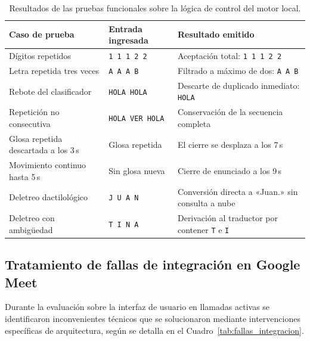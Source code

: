 \begin{table}[H]
\centering
\small
\caption{Resultados de las pruebas funcionales sobre la lógica de control del motor local.}
\label{tab:bateria_logica}
\begin{tabularx}{\textwidth}{l l X}
\toprule
\textbf{Caso de prueba} & \textbf{Entrada ingresada} & \textbf{Resultado emitido} \\
\midrule
Dígitos repetidos & \texttt{1 1 1 2 2} & Aceptación total: \texttt{1 1 1 2 2} \\
Letra repetida tres veces & \texttt{A A A B} & Filtrado a máximo de dos: \texttt{A A B} \\
Rebote del clasificador & \texttt{HOLA HOLA} & Descarte de duplicado inmediato: \texttt{HOLA} \\
Repetición no consecutiva & \texttt{HOLA VER HOLA} & Conservación de la secuencia completa \\
Glosa repetida descartada a los 3\,s & Glosa repetida & El cierre se desplaza a los 7\,s \\
Movimiento continuo hasta 5\,s & Sin glosa nueva & Cierre de enunciado a los 9\,s \\
Deletreo dactilológico & \texttt{J U A N} & Conversión directa a «Juan.» sin consulta a nube \\
Deletreo con ambigüedad & \texttt{T I N A} & Derivación al traductor por contener \texttt{T} e \texttt{I} \\
\bottomrule
\end{tabularx}
\end{table}

\subsection{Tratamiento de fallas de integración en Google Meet}
Durante la evaluación sobre la interfaz de usuario en llamadas activas se identificaron inconvenientes técnicos que se solucionaron mediante intervenciones específicas de arquitectura, según se detalla en el Cuadro~\ref{tab:fallas_integracion}.

